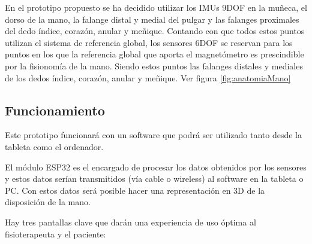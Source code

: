En el prototipo propuesto se ha decidido utilizar los IMUs 9DOF en la muñeca, el dorso de la mano, la falange distal y medial del pulgar y las falanges proximales del dedo índice, corazón, anular y meñique. Contando con que todos estos puntos utilizan el sistema de referencia global, los sensores 6DOF se reservan para los puntos en los que la referencia global que aporta el magnetómetro es prescindible por la fisionomía de la mano. Siendo estos puntos las falanges distales y mediales de los dedos índice, corazón, anular y meñique. Ver figura \ref{fig:anatomiaMano}


\subsection{Funcionamiento}
\label{sec:funcionamiento4}

Este prototipo funcionará con un software que podrá ser utilizado tanto desde la tableta como el ordenador. 

El módulo ESP32 es el encargado de procesar los datos obtenidos por los sensores y estos datos serían transmitidos (vía cable o wireless) al software en la tableta o PC. Con estos datos será posible hacer una representación en 3D de la disposición de la mano. 

Hay tres pantallas clave que darán una experiencia de uso óptima al fisioterapeuta y el paciente:


